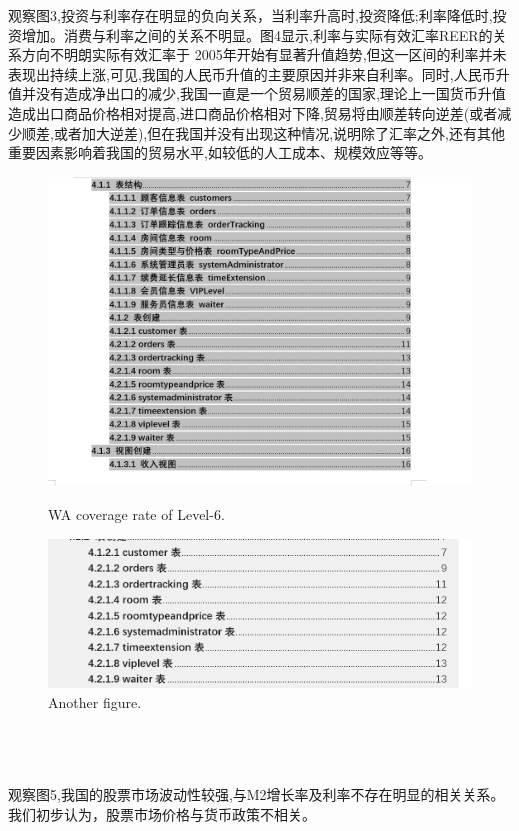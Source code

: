 \documentclass{ijclclp}
\begin{document}
观察图3,投资与利率存在明显的负向关系，当利率升高时,投资降低;利率降低时,投资增加。消费与利率之间的关系不明显。图4显示,利率与实际有效汇率REER的关系方向不明朗实际有效汇率于 2005年开始有显著升值趋势,但这一区间的利率并未表现出持续上涨,可见,我国的人民币升值的主要原因并非来自利率。同时,人民币升值并没有造成净出口的减少,我国一直是一个贸易顺差的国家,理论上一国货币升值造成出口商品价格相对提高,进口商品价格相对下降,贸易将由顺差转向逆差(或者减少顺差,或者加大逆差),但在我国并没有出现这种情况,说明除了汇率之外,还有其他重要因素影响着我国的贸易水平,如较低的人工成本、规模效应等等。

\begin{figure}[h]
    \centering
    \begin{minipage}{0.45\textwidth}
        \centering
        \includegraphics[width=\textwidth]{img/图3.png}
        \caption{WA coverage rate of Level-6.}
        \label{fig:figure3}
    \end{minipage}
    \hfill
    \begin{minipage}{0.45\textwidth}
        \centering
        \includegraphics[width=\textwidth]{img/图4.png}
        \caption{Another figure.}
        \label{fig:figure4}
    \end{minipage}
\end{figure}
\textbf{}
\\
\\
\\
观察图5,我国的股票市场波动性较强,与M2增长率及利率不存在明显的相关关系。我们初步认为，股票市场价格与货币政策不相关。
\end{document}

